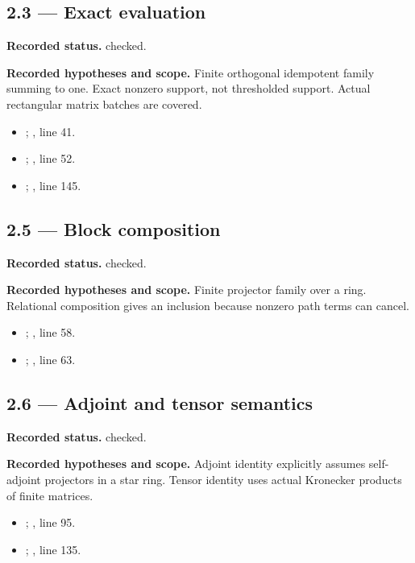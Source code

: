 \subsection{2.3 — Exact evaluation}
\label{result:2.3}
\textbf{Recorded status.} checked.

\textbf{Recorded hypotheses and scope.} Finite orthogonal idempotent family summing to one. Exact nonzero support, not thresholded support. Actual rectangular matrix batches are covered.

\begin{itemize}
\item {}; , line 41.
\item {}; , line 52.
\item {}; , line 145.
\end{itemize}
\subsection{2.5 — Block composition}
\label{result:2.5}
\textbf{Recorded status.} checked.

\textbf{Recorded hypotheses and scope.} Finite projector family over a ring. Relational composition gives an inclusion because nonzero path terms can cancel.

\begin{itemize}
\item {}; , line 58.
\item {}; , line 63.
\end{itemize}
\subsection{2.6 — Adjoint and tensor semantics}
\label{result:2.6}
\textbf{Recorded status.} checked.

\textbf{Recorded hypotheses and scope.} Adjoint identity explicitly assumes self-adjoint projectors in a star ring. Tensor identity uses actual Kronecker products of finite matrices.

\begin{itemize}
\item {}; , line 95.
\item {}; , line 135.
\end{itemize}
